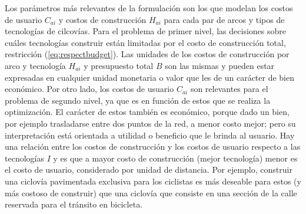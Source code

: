 Los parámetros más relevantes de la formulación son los que modelan los costos de usuario $C_{ai}$ y costos de construcción $H_{ai}$ para cada par de arcos y tipos de tecnologías de cilcovías. Para el problema de primer nivel, las decisiones sobre cuáles tecnologías construir están limitadas por el costo de construcción total, restricción (\ref{eq:respectbudget}). Las unidades de los costos de construcción por arco y tecnología $H_{ai}$ y presupuesto total $B$ son las mismas y pueden estar expresadas en cualquier unidad monetaria o valor que les de un carácter de bien económico. Por otro lado, los costos de usuario $C_{ai}$ son relevantes para el problema de segundo nivel, ya que es en función de estos que se realiza la optimización. El carácter de estos también es económico, porque dado un bien, por ejemplo trasladarse entre dos puntos de la red, a menor costo mejor; pero su interpretación está orientada a utilidad o beneficio que le brinda al usuario. Hay una relación entre los costos de construcción y los costos de usuario respecto a las tecnologías $I$ y es que a mayor costo de construcción (mejor tecnología) menor es el costo de usuario, considerado por unidad de distancia. Por ejemplo, construir una ciclovía pavimentada exclusiva para los ciclistas es más deseable para estos (y más costoso de construir) que una ciclovía que consiste en una sección de la calle reservada para el tránsito en bicicleta.


